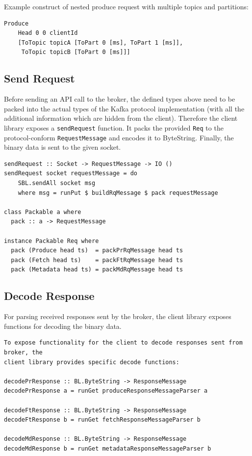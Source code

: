 Example construct of nested produce request with multiple topics and partitions:
\begin{verbatim}
Produce 
    Head 0 0 clientId
    [ToTopic topicA [ToPart 0 [ms], ToPart 1 [ms]],
     ToTopic topicB [ToPart 0 [ms]]]

\end{verbatim}


\subsection{Send Request}
Before sending an API call to the broker, the defined types above need to be
packed into the actual types of the Kafka protocol implementation (with all the
additional information which are hidden from the client). Therefore the client
library exposes a \lstinline{sendRequest} function. It packs the provided
\lstinline{Req} to the protocol-conform \lstinline{RequestMessage} and encodes it
to ByteString. Finally, the binary data is sent to the given socket.

\begin{lstlisting}[caption={Pack and send function of client API}]
sendRequest :: Socket -> RequestMessage -> IO ()
sendRequest socket requestMessage = do
    SBL.sendAll socket msg
    where msg = runPut $ buildRqMessage $ pack requestMessage

class Packable a where
  pack :: a -> RequestMessage

instance Packable Req where
  pack (Produce head ts)  = packPrRqMessage head ts
  pack (Fetch head ts)    = packFtRqMessage head ts
  pack (Metadata head ts) = packMdRqMessage head ts

\end{lstlisting}

\subsection{Decode Response}
For parsing received responses sent by the broker, the client library exposes
functions for decoding the binary data. 

\begin{lstlisting}[caption={Exposed decode functions of client API}]
To expose functionality for the client to decode responses sent from broker, the
client library provides specific decode functions: 

decodePrResponse :: BL.ByteString -> ResponseMessage
decodePrResponse a = runGet produceResponseMessageParser a

decodeFtResponse :: BL.ByteString -> ResponseMessage
decodeFtResponse b = runGet fetchResponseMessageParser b

decodeMdResponse :: BL.ByteString -> ResponseMessage
decodeMdResponse b = runGet metadataResponseMessageParser b
\end{lstlisting}

